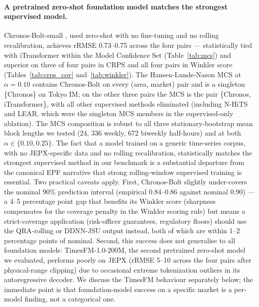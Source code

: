 \documentclass[review,3p,times,authoryear]{elsarticle}
\begin{document}
\paragraph{A pretrained zero-shot foundation model matches the strongest supervised model.}
Chronos-Bolt-small \citep{ansari2024chronos}, used zero-shot with no fine-tuning and no rolling recalibration, achieves rRMSE 0.73--0.75 across the four pairs --- statistically tied with iTransformer within the Model Confidence Set (Table~\ref{tab:mcs}) and superior on three of four pairs in CRPS and all four pairs in Winkler score (Tables~\ref{tab:crps_cov} and~\ref{tab:winkler}). The Hansen-Lunde-Nason MCS at \(\alpha = 0.10\) contains Chronos-Bolt on every (area, market) pair and is a singleton \{Chronos\} on Tokyo IM; on the other three pairs the MCS is the pair \{Chronos, iTransformer\}, with all other supervised methods eliminated (including N-HiTS and LEAR, which were the singleton MCS members in the supervised-only ablation). The MCS composition is robust to all three stationary-bootstrap mean block lengths we tested (24, 336 weekly, 672 biweekly half-hours) and at both \(\alpha\in\{0.10, 0.25\}\). The fact that a model trained on a generic time-series corpus, with no JEPX-specific data and no rolling recalibration, statistically matches the strongest supervised method in our benchmark is a substantial departure from the canonical EPF narrative that strong rolling-window supervised training is essential. Two practical caveats apply. First, Chronos-Bolt slightly under-covers the nominal 90\% prediction interval (empirical 0.84--0.86 against nominal 0.90) --- a 4--5 percentage point gap that benefits its Winkler score (sharpness compensates for the coverage penalty in the Winkler scoring rule) but means a strict-coverage application (risk-officer guarantees, regulatory floors) should use the QRA-rolling or DDNN-JSU output instead, both of which are within 1--2 percentage points of nominal. Second, this success does not generalise to all foundation models: TimesFM-1.0-200M, the second pretrained zero-shot model we evaluated, performs poorly on JEPX (rRMSE 5--10 across the four pairs after physical-range clipping) due to occasional extreme tokenization outliers in its autoregressive decoder. We discuss the TimesFM behaviour separately below; the immediate point is that foundation-model success on a specific market is a per-model finding, not a categorical one.
\end{document}
